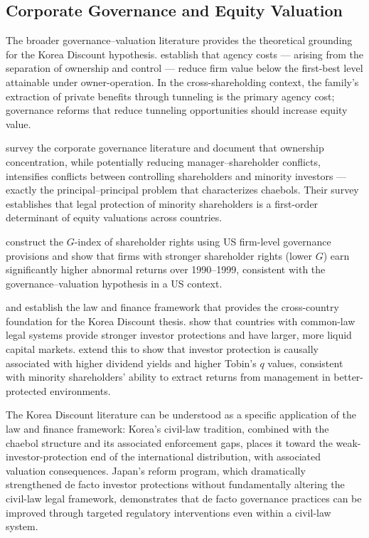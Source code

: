 \documentclass[12pt]{article}
\begin{document}
\subsection{Corporate Governance and Equity Valuation}

The broader governance--valuation literature provides the theoretical grounding for the
Korea Discount hypothesis. \citet{jensen1976} establish that agency costs --- arising from
the separation of ownership and control --- reduce firm value below the first-best level
attainable under owner-operation. In the cross-shareholding context, the family's extraction
of private benefits through tunneling is the primary agency cost; governance reforms that
reduce tunneling opportunities should increase equity value.

\citet{shleifer1997} survey the corporate governance literature and document that ownership
concentration, while potentially reducing manager--shareholder conflicts, intensifies
conflicts between controlling shareholders and minority investors --- exactly the
principal--principal problem that characterizes chaebols. Their survey establishes that
legal protection of minority shareholders is a first-order determinant of equity valuations
across countries.

\citet{gompers2003} construct the $G$-index of shareholder rights using US firm-level
governance provisions and show that firms with stronger shareholder rights (lower $G$)
earn significantly higher abnormal returns over 1990--1999, consistent with the
governance--valuation hypothesis in a US context.

\citet{porta1998} and \citet{porta2002} establish the law and finance framework that
provides the cross-country foundation for the Korea Discount thesis. \citet{porta1998}
show that countries with common-law legal systems provide stronger investor protections
and have larger, more liquid capital markets. \citet{porta2002} extend this to show that
investor protection is causally associated with higher dividend yields and higher Tobin's
$q$ values, consistent with minority shareholders' ability to extract returns from
management in better-protected environments.

The Korea Discount literature can be understood as a specific application of the law and
finance framework: Korea's civil-law tradition, combined with the chaebol structure and
its associated enforcement gaps, places it toward the weak-investor-protection end of the
international distribution, with associated valuation consequences. Japan's reform program,
which dramatically strengthened de facto investor protections without fundamentally altering
the civil-law legal framework, demonstrates that de facto governance practices can be
improved through targeted regulatory interventions even within a civil-law system.
\end{document}
